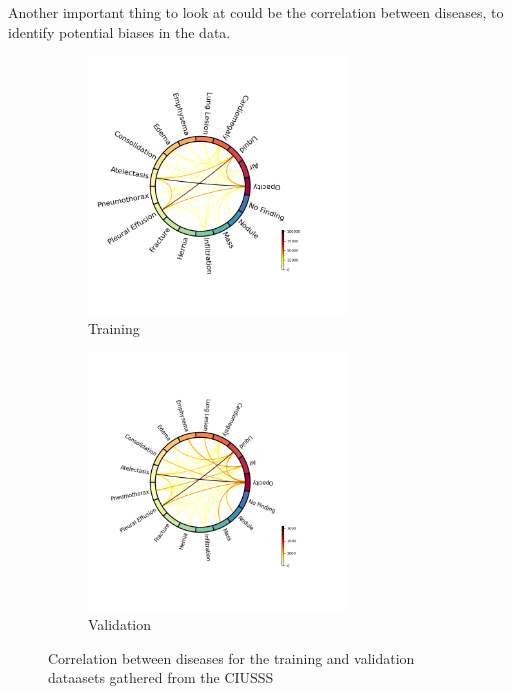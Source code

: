 \documentclass[11pt]{article}
\begin{document}
    Another important thing to look at could be the correlation between diseases, to identify potential biases in the data.

\begin{figure}
     \centering
     \begin{subfigure}[b]{\textwidth}
         \centering
         \includegraphics[width=0.75\textwidth]{plots/chords_ciusss_train.png}
         \caption{Training}
         \label{fig:y equals x}
     \end{subfigure}
     \hfill
     \begin{subfigure}[b]{\textwidth}
         \centering
         \includegraphics[width=0.75\textwidth]{plots/chords_ciusss_valid.png}
         \caption{Validation}
         \label{fig:correlation_ciusss}
     \end{subfigure}
     \hfill

        \caption{Correlation between diseases for the training and validation dataasets gathered from the CIUSSS}
        \label{fig:three graphs}

\end{figure}
\end{document}
